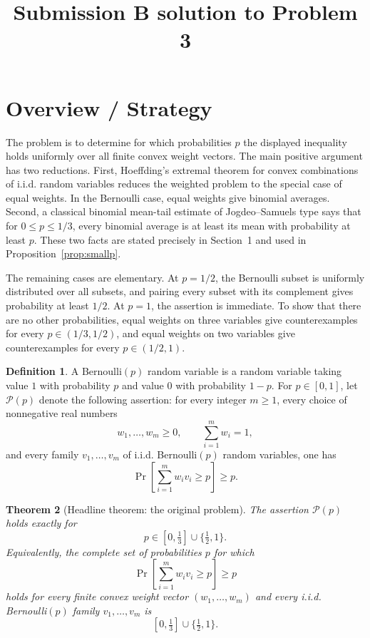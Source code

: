 \documentclass[12pt]{article}
\theoremstyle{definition}
\newtheorem{definition}{Definition}
\theoremstyle{plain}
\newtheorem{theorem}[definition]{Theorem}
\theoremstyle{remark}
\begin{document}
\title{Submission B solution to Problem 3}
\date{}
\maketitle

\section*{Overview / Strategy}

The problem is to determine for which probabilities \(p\) the displayed inequality holds uniformly over all finite convex weight vectors. The main positive argument has two reductions. First, Hoeffding's extremal theorem for convex combinations of i.i.d. random variables reduces the weighted problem to the special case of equal weights. In the Bernoulli case, equal weights give binomial averages. Second, a classical binomial mean-tail estimate of Jogdeo--Samuels type says that for \(0\le p\le 1/3\), every binomial average is at least its mean with probability at least \(p\). These two facts are stated precisely in Section~1 and used in Proposition~\ref{prop:smallp}.

The remaining cases are elementary. At \(p=1/2\), the Bernoulli subset is uniformly distributed over all subsets, and pairing every subset with its complement gives probability at least \(1/2\). At \(p=1\), the assertion is immediate. To show that there are no other probabilities, equal weights on three variables give counterexamples for every \(p\in(1/3,1/2)\), and equal weights on two variables give counterexamples for every \(p\in(1/2,1)\).

\begin{definition}
A Bernoulli\((p)\) random variable is a random variable taking value \(1\) with probability \(p\) and value \(0\) with probability \(1-p\). For \(p\in[0,1]\), let \(\mathcal P(p)\) denote the following assertion:
for every integer \(m\ge1\), every choice of nonnegative real numbers
\[
w_1,\ldots,w_m\ge0,\qquad \sum_{i=1}^{m}w_i=1,
\]
and every family \(v_1,\ldots,v_m\) of i.i.d. Bernoulli\((p)\) random variables, one has
\[
\Pr\!\left[\sum_{i=1}^{m}w_i v_i\ge p\right]\ge p.
\]
\end{definition}

\begin{theorem}[Headline theorem: the original problem]\label{thm:main}
The assertion \(\mathcal P(p)\) holds exactly for
\[
p\in[0,\tfrac13]\cup\{\tfrac12,1\}.
\]
Equivalently, the complete set of probabilities \(p\) for which
\[
\Pr\!\left[\sum_{i=1}^{m} w_i v_i\ge p\right]\ge p
\]
holds for every finite convex weight vector \((w_1,\ldots,w_m)\) and every i.i.d. Bernoulli\((p)\) family \(v_1,\ldots,v_m\) is
\[
\boxed{[0,\tfrac13]\cup\{\tfrac12,1\}}.
\]
\end{theorem}
\end{document}
